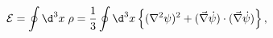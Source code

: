 \begin{equation}
{\mathcal E} = \oint \d^3 x \; \rho = 
{1\over3} \oint \d^3 x \left\{ 
(\nabla^2 \psi)^2
+
(\vec  \nabla\dot\psi)\cdot(\vec  \nabla\dot\psi)
\right\},
\label{E:energy1}
\end{equation}

